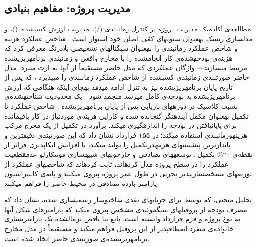 \subsection{مدیریت پروژه: مفاهیم بنیادی}
\label{subsec:lr_pm}

مطالعه‌ی آکادمیک مدیریت پروژه بر کنترل زمان\zwnj{}بندی
(/)، مدیریت ارزش کسب\zwnj{}شده~()،
و مدل\zwnj{}سازی ریسک به\zwnj{}عنوان ستون\zwnj{}های کمّی اصلی خود استوار است
\citep{Fleming2010, PMI2021}.
 شاخص عملکرد هزینه و شاخص عملکرد زمان\zwnj{}بندی را
به\zwnj{}عنوان سیگنال\zwnj{}های تشخیصی بلادرنگ معرفی کرد که
هزینه‌ی بودجه\zwnj{}شده‌ی کار انجام\zwnj{}شده را با مخارج واقعی
و زمان\zwnj{}بندی برنامه\zwnj{}ریزی\zwnj{}شده مرتبط می\zwnj{}سازند---
واژگان عملکردی که مدل حاضر مستقیماً از آن\zwnj{}ها به ارث می\zwnj{}برد.
مدل حاضر صورت\zwnj{}بندی زمان\zwnj{}بندی کسب\zwnj{}شده
از شاخص عملکرد زمان\zwnj{}بندی را می\zwnj{}پذیرد \citep{Lipke2003}،
که پس از تاریخ پایان برنامه\zwnj{}ریزی\zwnj{}شده نیز به تنزل ادامه می\zwnj{}دهد
به\zwnj{}جای اینکه هنگامی که ارزش برنامه\zwnj{}ریزی\zwnj{}شده به بودجه‌ی کامل می\zwnj{}رسد
منجمد شود---یک محدودیت شناخته\zwnj{}شده‌ی نسبت کلاسیک
در دوره\zwnj{}های بازیابی پس از پایان برنامه\zwnj{}ریزی\zwnj{}شده
\citep{Lipke2003, Henderson2004}.
شاخص عملکرد تا تکمیل به\zwnj{}عنوان مکمل آینده\zwnj{}نگر گنجانده شده
و کارایی هزینه‌ی موردنیاز در کار باقی\zwnj{}مانده
برای پایان\zwnj{}یافتن در بودجه را اندازه\zwnj{}گیری می\zwnj{}کند.
برآورد در تکمیل از یک مخرج مرکب هزینه\zwnj{}و\zwnj{}زمان\zwnj{}بندی استفاده می\zwnj{}کند؛
\citet{christensen1993cost} در ۱۵۵ قرارداد نشان داد که این صورت\zwnj{}بندی
دقیق\zwnj{}ترین و پایدارترین پیش\zwnj{}بینی\zwnj{}های هزینه\zwnj{}در\zwnj{}تکمیل را تولید می\zwnj{}کند،
با افزایش اتکاپذیری فراتر از نقطه‌ی ۲۰\% تکمیل \citep{Lipke2003}.
توسعه\zwnj{}های تصادفی  \citep{Acebes2015, Batselier2017}
و چارچوب\zwnj{}های شبیه\zwnj{}سازی مونت\zwnj{}کارلو \citep{Kwak2007}
عدم\zwnj{}قطعیت عملکرد را در سطح پروژه مدل کرده\zwnj{}اند،
ثابت کرده\zwnj{}اند که شاخص\zwnj{}های عملکرد از توزیع\zwnj{}های
مشخص\zwnj{}سازی\zwnj{}پذیر تجربی در طول عمر پروژه پیروی می\zwnj{}کنند
و پایه‌ی کالیبراسیون پارامتر بازده تصادفی در محیط حاضر را فراهم می\zwnj{}کنند.

تحلیل منحنی، که توسط \citet{Kenley2009} برای جریان\zwnj{}های
نقدی ساخت\zwnj{}وساز رسمی\zwnj{}سازی شده،
نشان داد که مصرف بودجه از پروفیل\zwnj{}های سیگموئیدی مشخص پیروی می\zwnj{}کند
که پارامترهای شکل آن\zwnj{}ها به نوع پروژه و فرم قرارداد وابسته است.
تابع بتا ناقص نرمال\zwnj{}شده یک پارامتری\zwnj{}سازی خانواده‌ی منفرد انعطاف\zwnj{}پذیر
از این پروفیل فراهم می\zwnj{}کند \citep{barraza2004probabilistic}
و مستقیماً در مدل مخارج برنامه\zwnj{}ریزی\zwnj{}شده‌ی صورت\zwnj{}بندی حاضر اتخاذ شده است.

